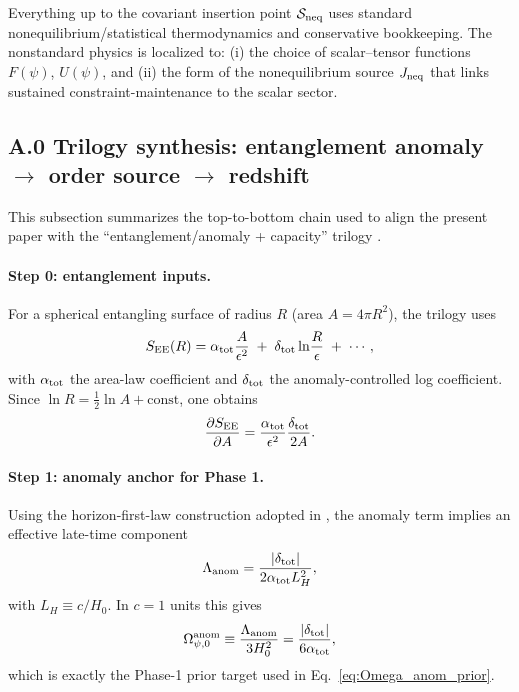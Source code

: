 \documentclass[10pt]{article}
\begin{document}
Everything up to the covariant insertion point \(\mathcal{S}_{\rm neq}\) uses standard
nonequilibrium/statistical thermodynamics and conservative bookkeeping. The nonstandard physics is
localized to: (i) the choice of scalar--tensor functions \(F(\psi)\), \(U(\psi)\), and (ii) the form
of the nonequilibrium source \(J_{\rm neq}\) that links sustained constraint-maintenance to the scalar
sector.


\subsection{A.0 Trilogy synthesis: entanglement anomaly \(\rightarrow\) order source \(\rightarrow\) redshift}
\label{app:trilogy_synthesis}

This subsection summarizes the top-to-bottom chain used to align the present paper with the
``entanglement/anomaly + capacity'' trilogy
\cite{MoonWalk2026PrecisionLatticeEntanglement,MoonWalk2026CosmologicalConstantEntanglement,MoonWalk2026EinsteinFromCapacity}.

\paragraph{Step 0: entanglement inputs.}
For a spherical entangling surface of radius \(R\) (area \(A=4\pi R^2\)), the trilogy uses
\begin{equation}
S_{\rm EE}(R)=\alpha_{\rm tot}\frac{A}{\epsilon^2}
\;+\;\delta_{\rm tot}\ln\!\frac{R}{\epsilon}
\;+\;\cdots,
\label{eq:app_tri_see}
\end{equation}
with \(\alpha_{\rm tot}\) the area-law coefficient and \(\delta_{\rm tot}\) the anomaly-controlled log coefficient.
Since \(\ln R=\frac{1}{2}\ln A+\text{const}\), one obtains
\begin{equation}
\frac{\partial S_{\rm EE}}{\partial A}
=
\frac{\alpha_{\rm tot}}{\epsilon^2}
\frac{\delta_{\rm tot}}{2A}.
\label{eq:app_tri_dSdA}
\end{equation}

\paragraph{Step 1: anomaly anchor for Phase 1.}
Using the horizon-first-law construction adopted in
\cite{MoonWalk2026CosmologicalConstantEntanglement},
the anomaly term implies an effective late-time component
\begin{equation}
\Lambda_{\rm anom}=\frac{|\delta_{\rm tot}|}{2\alpha_{\rm tot}L_H^2},
\label{eq:app_tri_lambda}
\end{equation}
with \(L_H\equiv c/H_0\). In \(c=1\) units this gives
\begin{equation}
\Omega_{\psi,0}^{\rm anom}
\equiv \frac{\Lambda_{\rm anom}}{3H_0^2}
=\frac{|\delta_{\rm tot}|}{6\alpha_{\rm tot}},
\end{equation}
which is exactly the Phase-1 prior target used in Eq.~\eqref{eq:Omega_anom_prior}.
\end{document}

